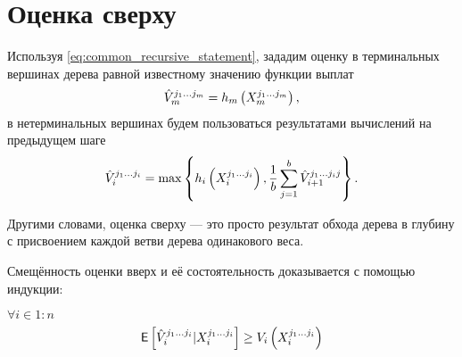 \section{Оценка сверху}
	\par Используя \eqref{eq:common_recursive_statement}, зададим оценку в терминальных вершинах дерева равной известному значению функции выплат
	\begin{equation}\label{eq:upper-terminal}
		\hat{V}_m^{j_1 \ldots j_m} = h_m\left(X_m^{j_1 \ldots j_m}\right),
	\end{equation}
	в нетерминальных вершинах будем пользоваться результатами вычислений на предыдущем шаге
	\begin{equation}\label{eq:upper-node}
		\hat{V}_i^{j_1 \ldots j_i} = \max \left\lbrace h_i \left( X_i^{j_1 \ldots j_i} \right), \frac{1}{b} \sum_{j = 1}^b \hat{V}_{i+1}^{j_1 \ldots j_i j}\right\rbrace .
	\end{equation}
	\par Другими словами, оценка сверху --- это просто результат обхода дерева в глубину с присвоением каждой ветви дерева одинакового веса.
	\par Смещённость оценки вверх и её состоятельность доказывается с помощью индукции:
	\begin{theorem}
		$\forall i \in 1:n$
		\begin{equation*}
		\mathsf{E}\left[\hat{V}_i^{j_1\ldots j_i}|X_i^{j_1\ldots j_i}\right] \geq V_i\left(X_i^{j_1\ldots j_i}\right)
		\end{equation*}
	\end{theorem}

